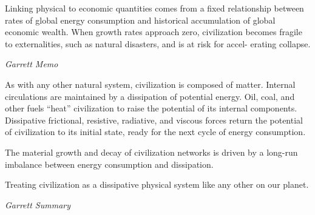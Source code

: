 \documentclass[
]{book}
\begin{document}
Linking physical to economic quantities comes from a ﬁxed relationship between rates
of global energy consumption and historical accumulation of global economic wealth. When growth rates
approach zero, civilization becomes fragile to externalities, such as natural disasters, and is at risk for accel-
erating collapse.

\emph{Garrett Memo}

As with any other natural system, civilization is composed of matter. Internal circulations are maintained
by a dissipation of potential energy. Oil, coal, and other fuels ``heat'' civilization to raise the potential of its
internal components. Dissipative frictional, resistive, radiative, and viscous forces return the potential of
civilization to its initial state, ready for the next cycle of energy consumption.

The material growth and decay of civilization networks is
driven by a long-run imbalance between energy consumption and dissipation.

Treating civilization as a dissipative physical system like any other on our planet.

\emph{Garrett Summary}
\end{document}
